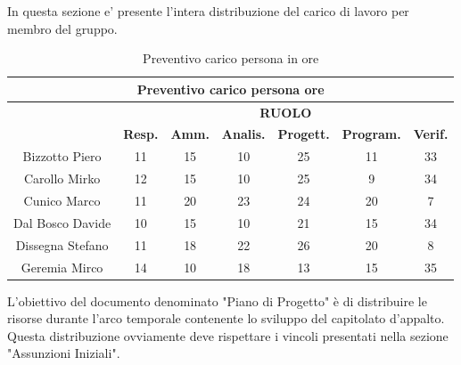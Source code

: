 In questa sezione e' presente l'intera distribuzione del carico di lavoro per membro del gruppo.\\

\begin{table}[!h]
	\begin{center}
		  \begin{tabular}
			  {|c|c|c|c|c|c|c|}
		 \hline
			\multicolumn{7}{|c|}{ \textbf{Preventivo carico persona ore} } \\
			\hline
			& \multicolumn{6}{|c|}{ \textbf{RUOLO} } \\
			\hline
			& \textbf{Resp.} & \textbf{Amm.} & \textbf{Analis.} & \textbf{Progett.} & \textbf{Program.} & \textbf{Verif.} \\
			\hline
			Bizzotto Piero &  11   &  15 &  10   &   25  &  11   &  33   \\ %
			\hline
			Carollo Mirko &  12   &  15  &  10  &  25   &  9   &  34   \\ %
			\hline
			Cunico Marco    &  11   &  20  &  23   &  24   &  20   &  7   \\ %
			\hline
			Dal Bosco Davide        &  10   &  15   &  10   &  21   &   15  &  34  \\ %
			\hline
			Dissegna Stefano        &  11  &  18   & 22  &  26   &  20  &  8  \\ %
			\hline
			Geremia Mirco   &   14  &  10   &  18   &  13  &  15   &  35   \\ %
			\hline		
		\end{tabular}
	\caption{Preventivo carico persona in ore} %
	\label{tab:TabellaPrevPersOre}
	\end{center}	
\end{table}

L'obiettivo del documento denominato "Piano di Progetto" \`e di distribuire le risorse durante l'arco temporale 
contenente lo sviluppo del capitolato d'appalto. Questa distribuzione ovviamente deve rispettare i vincoli presentati 
nella sezione "Assunzioni Iniziali".

